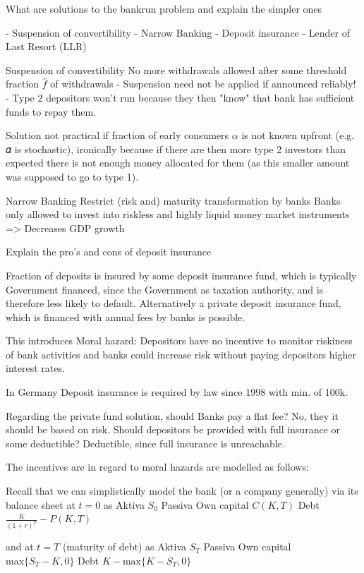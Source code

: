 What are solutions to the bankrun problem and explain the simpler ones

- Suspension of convertibility
- Narrow Banking
- Deposit insurance
- Lender of Last Resort (LLR)

Suspension of convertibility
No more withdrawals allowed after some threshold fraction \( \hat{f} \) of
withdrawals
- Suspension need not be applied if announced reliably!
- Type 2 depositors won't run because they then "know" that bank has sufficient funds to repay them.

Solution not practical if fraction of early consumers \( \alpha \) is not
known upfront (e.g. 𝛼 is stochastic), ironically because if there are then more type 2
investors than expected there is not enough money allocated for them (as this smaller amount was supposed to go to type 1).

Narrow Banking
Restrict (risk and) maturity transformation by banks
Banks only allowed to invest into riskless and highly liquid money market instruments
=> Decreases GDP growth


Explain the pro's and cons of deposit insurance

Fraction of deposits is insured by some deposit insurance fund, which is typically Government financed,
since the Government as taxation authority, and is therefore less likely to default.
Alternatively a private deposit insurance fund, which is financed with annual fees by banks is possible.

This introduces Moral hazard:
Depositors have no incentive to monitor riskiness of bank activities and banks could increase risk without 
paying depositors higher interest rates.

In Germany Deposit insurance is required by law since 1998 with min. of 100k.

Regarding the private fund solution, should Banks pay a flat fee? 
No, they it should be based on risk.
Should depositors be provided with full insurance or some
deductible? Deductible, since full insurance is unreachable.


The incentives are in regard to moral hazards are modelled as follows:

Recall that we can simplistically model the bank (or a company generally) via its balance sheet 
at \( t = 0 \) as 
Aktiva 
\( S_0 \)
Passiva
Own capital
\( C(K, T) \)
Debt
\( \frac{K}{(1 + r)^T} - P(K, T) \)

and at \( t = T \) (maturity of debt) as
Aktiva 
\( S_T \)
Passiva
Own capital 
\( \text{max}\{S_T - K, 0\} \)
Debt
\( K - \text{max}\{K - S_T, 0\} \)

